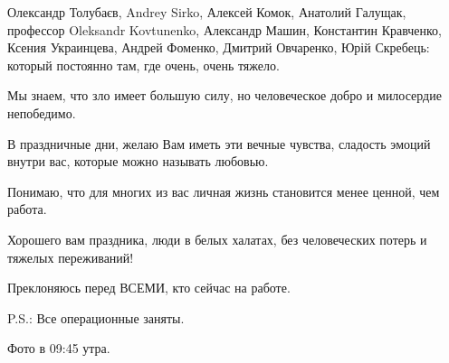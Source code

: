 Олександр Толубаєв, Andrey Sirko, Алексей Комок, Анатолий Галущак, профессор
Oleksandr Kovtunenko, Александр Машин, Константин Кравченко, Ксения Украинцева,
Андрей Фоменко,   Дмитрий Овчаренко, Юрій Скребець: который постоянно там, где
очень, очень тяжело. 

Мы знаем, что зло имеет большую силу, но человеческое добро и милосердие
непобедимо.

В праздничные дни, желаю Вам иметь эти вечные чувства, сладость эмоций внутри
вас, которые можно называть любовью.

Понимаю, что для многих из вас личная жизнь становится менее ценной, чем
работа. 

Хорошего вам праздника, люди в белых халатах, без человеческих потерь и тяжелых
переживаний!

Преклоняюсь перед ВСЕМИ, кто сейчас на работе.

P.S.: Все операционные заняты.

Фото в 09:45 утра.

